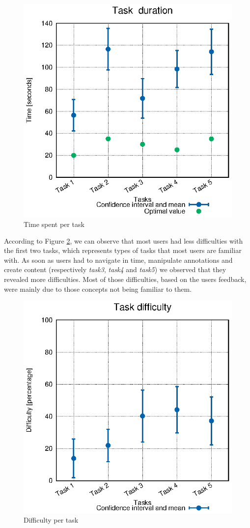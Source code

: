 \documentclass[conference,compsoc,a4paper]{IEEEtran}
\begin{document}
\begin{figure}
  \centering
    \includegraphics[width=0.8\linewidth]{stats/user_times.eps}
    \caption{Time spent per task}
    \label{fig:user_times}
\end{figure}

According to Figure \ref{fig:user_diffs}, we can observe that most users had less difficulties with the first two tasks, which represents types of tasks that most users are familiar with. As soon as users had to navigate in time, manipulate annotations and create content (respectively \emph{task3}, \emph{task4} and \emph{task5}) we observed that they revealed more difficulties. Most of those difficulties, based on the users feedback, were mainly due to those concepts not being familiar to them.



\begin{figure}
  \centering
    \includegraphics[width=0.8\linewidth]{stats/user_diffs.eps}
  \caption{Difficulty per task}
  \label{fig:user_diffs}
\end{figure}
\end{document}
